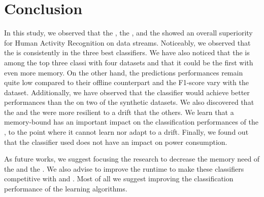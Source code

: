 \section{Conclusion}
In this study, we observed that the \hoeffdingtree, the \mondrianforest, and
the \naivebayes showed an overall superiority for Human Activity Recognition on
data streams. Noticeably, we observed that the \hoeffdingtree is consistently
in the three best classifiers. We have also noticed that the \mondrianforest is
among the top three classi with four datasets and that it could be the first
with even more memory.  On the other hand, the predictions performances remain
quite low compared to their offline counterpart and the F1-score vary with the
dataset. Additionally, we have observed that the \mcnn classifier would achieve
better performances than the \naivebayes on two of the synthetic datasets. 
We also discovered that the \hoeffdingtree and the \mcnns were more resilient
to a drift that the others.  We learn that a memory-bound has an important
impact on the classification performances of the \mondrianforest, to the point
where it cannot learn nor adapt to a drift.  Finally, we found out that the
classifier used does not have an impact on power consumption.

As future works, we suggest focusing the research to decrease the memory need
of the \hoeffdingtree and the \mondrianforest. We also advise to improve the
runtime to make these classifiers competitive with \mcnn and \FNN. Most of all
we suggest improving the classification performance of the learning
algorithms.
